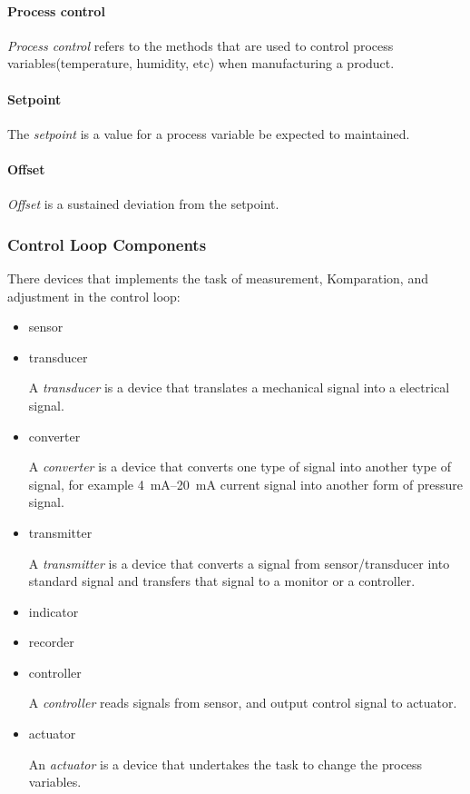 \paragraph{Process control} \emph{Process control} refers to the methods that are used to control process variables(temperature, humidity, etc) when manufacturing a product.

\paragraph{Setpoint} The \emph{setpoint} is a value for a process variable be expected to maintained.

\paragraph{Offset} \emph{Offset} is a sustained deviation from the setpoint.

\subsubsection{Control Loop Components}

There devices that implements the task of measurement, Komparation, and adjustment in the control loop:

\begin{itemize}
  \item sensor
  \item transducer

  A \emph{transducer} is a device that translates a mechanical signal into a electrical signal.

  \item converter

  A \emph{converter} is a device that converts one type of signal into another type of signal, for example \SIrange{4}{20}{\milli\ampere} current signal into another form of pressure signal.

  \item transmitter

  A \emph{transmitter} is a device that converts a signal from sensor/transducer into standard signal and transfers that signal to a monitor or a controller.

  \item indicator
  \item recorder
  \item controller

  A \emph{controller} reads signals from sensor, and output control signal to actuator.

  \item actuator

  An \emph{actuator} is a device that undertakes the task to change the process variables.
\end{itemize}

